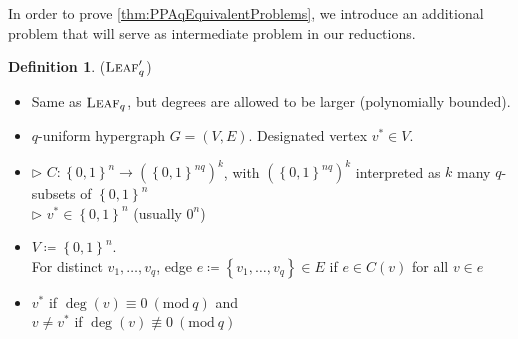 \documentclass[10pt,a4paper]{article}
\theoremstyle{definition}
\newtheorem{definition}[theorem]{Definition}
\theoremstyle{remark}
\newcommand{\contour}[2]{#2}
\newcommand{\inparen}[1]{\left ( #1 \right )}
\renewcommand{\mod}[1]{~\inparen{\mathrm{mod}~#1}}
\def\set#1{\left\{#1\right\}}
\newcommand{\bit}{\ensuremath{\set{0,1}}}
\newcommand{\leaf}{\ensuremath\textsc{Leaf}}
\begin{document}
In order to prove \autoref{thm:PPAqEquivalentProblems}, we introduce an additional problem that will serve as intermediate problem in our reductions.\\[1mm]


\noindent
\begin{minipage}{\linewidth}
\begin{definition}
	\label{def:leaf-prime} \contour{black}{($\leaf'_q$)}\vspace{-5pt}
	\begin{itemize}[leftmargin=2.15cm,itemsep=4pt]
		\item[\slshape Principle:] Same as $\leaf_q$, but degrees are allowed to be larger (polynomially bounded).
		\item[\slshape Object:] $q$-uniform hypergraph $G = (V, E)$. Designated vertex $v^* \in V$.
		\item[\slshape Inputs:] $\triangleright$ $C:\bit^n \to (\bit^{nq})^k$, with $(\bit^{nq})^k$ interpreted as $k$ many $q$-subsets of $\bit^n$\\
	$\triangleright$ $v^* \in \bit^n$ (usually $0^n$)
		\item[\slshape Encoding:] $V\coloneqq\bit^n$.\\
	For distinct $v_1, \ldots, v_q$, edge $e\coloneqq\set{v_1, \ldots, v_q}\in E$ if $e \in C(v)$ for all $v \in e$
		\item[\slshape Solutions:] $v^*$ if $\deg(v) \equiv 0 \mod{q}$ and\\
	$v \ne v^*$ if $\deg(v) \not\equiv 0 \mod{q}$
	\end{itemize}
\end{definition}
\end{minipage}\vspace{5mm}
\end{document}
